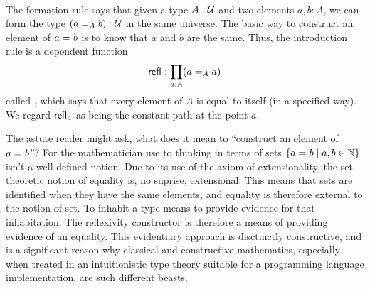 \begin{code}[hide]%
\>[0]\AgdaSpace{}%
\AgdaSpace{}%
\<%
\end{code}
\begin{code}%
\>[0][@{}l@{\AgdaIndent{1}}]%
\>[2]\AgdaSpace{}%
\AgdaSpace{}%
\AgdaSymbol{\{}\AgdaSpace{}%
\AgdaSymbol{:}\AgdaSpace{}%
\AgdaSymbol{\}}\AgdaSpace{}%
\AgdaSymbol{:}\AgdaSpace{}%
\AgdaSymbol{(}\AgdaSpace{}%
\AgdaSpace{}%
\AgdaSymbol{:}\AgdaSpace{}%
\AgdaSymbol{)}\AgdaSpace{}%
\AgdaSpace{}%
\AgdaSpace{}%
\<%
\\
\>[2][@{}l@{\AgdaIndent{0}}]%
\>[4]\AgdaSpace{}%
\AgdaSymbol{:}\AgdaSpace{}%
\AgdaSymbol{(}\AgdaSpace{}%
\AgdaSymbol{:}\AgdaSpace{}%
\AgdaSymbol{)}\AgdaSpace{}%
\AgdaSpace{}%
\AgdaSpace{}%
\AgdaSpace{}%
\<%
\end{code}
\begin{definition}
  The formation rule says that given a type $A:\UU$ and two elements $a,b:A$, we can form the type $(\id[A]{a}{b}):\UU$ in the same universe.
  The basic way to construct an element of $\id{a}{b}$ is to know that $a$ and $b$ are the same.
  Thus, the introduction rule is a dependent function
  \[\refl{} : \prod_{a:A} (\id[A]{a}{a}) \]
  called ,
  which says that every element of $A$ is equal to itself (in a specified way).  We regard $\refl{a}$ as being the
  constant path %
  at the point $a$.
\end{definition}

The astute reader might ask, what does it mean to ``construct an element of
$\id{a}{b}$''? For the mathematician use to thinking in terms of sets
$\{\id{a}{b} \mid a,b \in \mathbb{N} \}$ isn't a well-defined notion. Due to its
use of the axiom of extensionality, the set theoretic notion of equality is, no
suprise, extensional. This means that sets are identified when they have the
same elements, and equality is therefore external to the notion of set. To
inhabit a type means to provide evidence for that inhabitation. The reflexivity
constructor is therefore a means of providing evidence of an equality. This
evidentiary approach is disctinctly constructive, and is a significant reason
why classical and constructive mathematics, especially when treated in an
intuitionistic type theory suitable for a programming language implementation,
are such different beasts.

